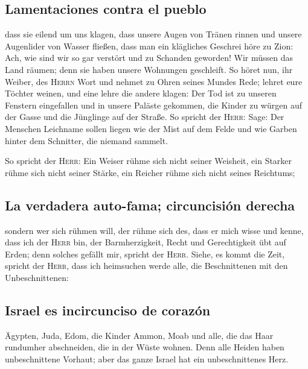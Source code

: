 \hypertarget{lamentaciones-contra-el-pueblo}{%
\subsection{Lamentaciones contra el
pueblo}\label{lamentaciones-contra-el-pueblo}}

 dass sie eilend um uns klagen, dass unsere Augen von
Tränen rinnen und unsere Augenlider von Wasser fließen, 
dass man ein klägliches Geschrei höre zu Zion: Ach, wie sind wir so gar
verstört und zu Schanden geworden! Wir müssen das Land räumen; denn sie
haben unsere Wohnungen geschleift.  So höret nun, ihr
Weiber, des \textsc{Herrn} Wort und nehmet zu Ohren seines Mundes Rede;
lehret eure Töchter weinen, und eine lehre die andere klagen:
 Der Tod ist zu unseren Fenstern eingefallen und in
unsere Paläste gekommen, die Kinder zu würgen auf der Gasse und die
Jünglinge auf der Straße.  So spricht der \textsc{Herr}:
Sage: Der Menschen Leichname sollen liegen wie der Mist auf dem Felde
und wie Garben hinter dem Schnitter, die niemand sammelt.

 So spricht der \textsc{Herr}: Ein Weiser rühme sich
nicht seiner Weisheit, ein Starker rühme sich nicht seiner Stärke, ein
Reicher rühme sich nicht seines Reichtums;

\hypertarget{la-verdadera-auto-fama-circuncisiuxf3n-derecha}{%
\subsection{La verdadera auto-fama; circuncisión
derecha}\label{la-verdadera-auto-fama-circuncisiuxf3n-derecha}}

 sondern wer sich rühmen will, der rühme sich des, dass
er mich wisse und kenne, dass ich der \textsc{Herr} bin, der
Barmherzigkeit, Recht und Gerechtigkeit übt auf Erden; denn solches
gefällt mir, spricht der \textsc{Herr}.  Siehe, es kommt
die Zeit, spricht der \textsc{Herr}, dass ich heimsuchen werde alle, die
Beschnittenen mit den Unbeschnittenen:

\hypertarget{israel-es-incircunciso-de-corazuxf3n}{%
\subsection{Israel es incircunciso de
corazón}\label{israel-es-incircunciso-de-corazuxf3n}}

 Ägypten, Juda, Edom, die Kinder Ammon, Moab und alle,
die das Haar rundumher abschneiden, die in der Wüste wohnen. Denn alle
Heiden haben unbeschnittene Vorhaut; aber das ganze Israel hat ein
unbeschnittenes Herz.

